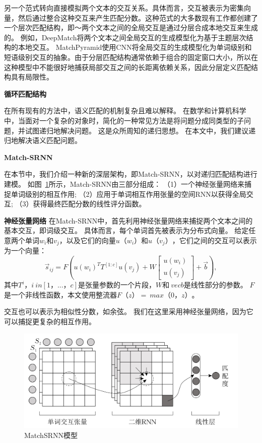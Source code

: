 另一个范式转向直接模拟两个文本的交互关系。具体而言，交互被表示为密集向量，然后通过整合这种交互来产生匹配分数。这种范式的大多数现有工作都创建了一个层次匹配结构，即〜两个文本之间的全局交互是通过分层合成本地交互来生成的。
例如，DeepMatch将两个文本之间全局交互的生成模型化为基于主题层次结构的本地交互。 MatchPyramid使用CNN将全局交互的生成模型化为单词级别和短语级别交互的抽象。由于分层匹配结构通常依赖于组合的固定窗口大小，所以在这种模型中不能很好地捕获局部交互之间的长距离依赖关系，因此分层定义匹配结构具有局限性。

\textbf{循环匹配结构}

在所有现有的方法中，语义匹配的机制复杂且难以解释。
在数学和计算机科学中，当面对一个复杂的对象时，简化的一种常见方法是将问题分成同类型的子问题，并试图递归地解决问题。 这是众所周知的递归思想。 在本文中，我们建议递归地解决语义匹配问题。
%
%


\textbf{Match-SRNN}

在本节中，我们介绍一种新的深层架构，即Match-SRNN，以对递归匹配结构进行建模。 如图~\ref{fig:architecture}所示，Match-SRNN由三部分组成：
（1）一个神经张量网络来捕捉单词级别的相互作用; （2）应用于单词相互作用张量的空间RNN以获得全局交互; （3）获得最终匹配分数的线性评分函数。

\textbf{神经张量网络}
在Match-SRNN中，首先利用神经张量网络来捕捉两个文本之间的基本交互，即词级交互。
具体而言，每个单词首先被表示为分布式向量。 给定任意两个单词$ w_i $和$ v_j $，以及它们的向量$ u（w_i）$和$ u（v_j）$，它们之间的交互可以表示为一个向量：
\begin{equation*}
\vec{s}_{ij}=F(u(w_i)^TT^{[1:c]}u(v_j)+W\begin{bmatrix}
		u(w_i)\\
		u(v_j)
	\end{bmatrix}+\vec{b}),
\end{equation*}
其中$ T ^ i，i \ in [1，...，c] $是张量参数的一个片段，$ W $和$ \ vec {b} $是线性部分的参数。 $ F $是一个非线性函数，本文使用整流器$ F（z）= \ max（0，z）$。

交互也可以表示为相似性分数，如余弦。 我们在这里采用神经张量网络，因为它可以捕捉更复杂的相互作用。
\begin{figure}[!htbp]
\vspace{1em}
\centering
  \includegraphics[width=0.9\linewidth]{figures/MatchSRNN.jpg}
  \caption{MatchSRNN模型}
  \label{fig:architecture}       %
\vspace{1em}
\end{figure}



